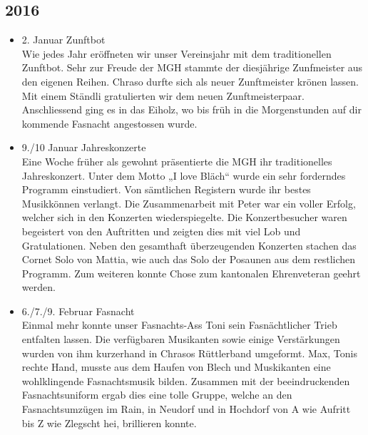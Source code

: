 \subsection*{2016}
\begin{history}

      \begin{itemize}

            \item 2. Januar Zunftbot\\
                  Wie jedes Jahr eröffneten wir unser Vereinsjahr mit dem
                  traditionellen Zunftbot. Sehr zur Freude der MGH stammte der
                  diesjährige Zunfmeister aus den eigenen Reihen. Chraso durfte
                  sich als neuer Zunftmeister krönen lassen. Mit einem Ständli
                  gratulierten wir dem neuen Zunftmeisterpaar. Anschliessend
                  ging es in das Eiholz, wo bis früh in die Morgenstunden auf
                  dir kommende Fasnacht angestossen wurde.

            \item 9./10 Januar Jahreskonzerte\\
                  Eine Woche früher als gewohnt präsentierte die MGH ihr
                  traditionelles Jahreskonzert. Unter dem Motto „I love Bläch“
                  wurde ein sehr forderndes Programm einstudiert. Von sämtlichen
                  Registern wurde ihr bestes Musikkönnen verlangt.  Die
                  Zusammenarbeit mit Peter war ein voller Erfolg, welcher sich
                  in den Konzerten wiederspiegelte. Die Konzertbesucher waren
                  begeistert von den Auftritten und zeigten dies mit viel Lob
                  und Gratulationen. Neben den gesamthaft überzeugenden
                  Konzerten stachen das Cornet Solo von Mattia, wie auch das
                  Solo der Posaunen aus dem restlichen Programm. Zum weiteren
                  konnte Chose zum kantonalen Ehrenveteran geehrt werden.

            \item 6./7./9. Februar Fasnacht\\
                  Einmal mehr konnte unser Fasnachts-Ass Toni sein
                  Fasnächtlicher Trieb entfalten lassen. Die verfügbaren
                  Musikanten sowie einige Verstärkungen wurden von ihm
                  kurzerhand in Chrasos Rüttlerband umgeformt. Max, Tonis rechte
                  Hand, musste aus dem Haufen von Blech und Muskikanten eine
                  wohlklingende Fasnachtsmusik bilden. Zusammen mit der
                  beeindruckenden Fasnachtsuniform ergab dies eine tolle Gruppe,
                  welche an den Fasnachtsumzügen im Rain, in Neudorf und in
                  Hochdorf von A wie Aufritt bis Z wie Zlegscht hei, brillieren
                  konnte.


\end{itemize}
\end{history}
